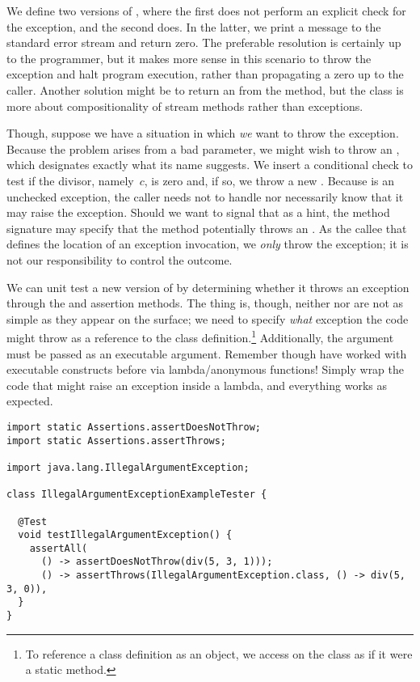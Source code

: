 We define two versions of , where the first does not perform an explicit check for the exception, and the second does. 
In the latter, we print a message to the standard error stream and return zero. 
The preferable resolution is certainly up to the programmer, but it makes more sense in this scenario to throw the exception and halt program execution, rather than propagating a zero up to the caller. 
Another solution might be to return an  from the method, but the  class is more about compositionality of stream methods rather than exceptions.

Though, suppose we have a situation in which \emph{we} want to throw the exception. 
Because the  problem arises from a bad parameter, we might wish to throw an , which designates exactly what its name suggests. 
We insert a conditional check to test if the divisor, namely~$c$, is zero and, if so, we throw a new . 
Because  is an unchecked exception, the caller needs not to handle nor necessarily know that it may raise the exception. 
Should we want to signal that as a hint, the method signature may specify that the method potentially throws an . 
As the callee that defines the location of an exception invocation, we \emph{only} throw the exception; it is not our responsibility to control the outcome. 

We can unit test a new version of  by determining whether it throws an exception through the  and  assertion methods. 
The thing is, though, neither  nor  are not as simple as they appear on the surface; we need to specify \emph{what} exception the code might throw as a reference to the class definition.\footnote{To reference a class definition as an object, we access  on the class as if it were a static method.} 
Additionally, the argument must be passed as an executable argument. 
Remember though have worked with executable constructs before via lambda/anonymous functions! 
Simply wrap the code that might raise an exception inside a lambda, and everything works as expected.

\newpage %
\begin{lstlisting}[language=MyJava]
import static Assertions.assertDoesNotThrow;
import static Assertions.assertThrows;

import java.lang.IllegalArgumentException;

class IllegalArgumentExceptionExampleTester {
  
  @Test
  void testIllegalArgumentException() {
    assertAll(
      () -> assertDoesNotThrow(div(5, 3, 1)));
      () -> assertThrows(IllegalArgumentException.class, () -> div(5, 3, 0)),
  }
}
\end{lstlisting}

